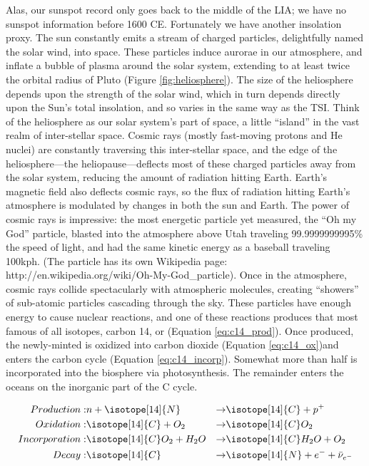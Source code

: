 Alas, our sunspot record only goes back to the middle of the LIA; we have no sunspot information before 1600 CE. Fortunately we have another insolation proxy. The sun constantly emits a stream of charged particles, delightfully named the solar wind, into space. These particles induce aurorae in our atmosphere, and inflate a bubble of plasma around the solar system, extending to at least twice the orbital radius of Pluto (Figure \ref{fig:heliosphere}). The size of the heliosphere depends upon the strength of the solar wind, which in turn depends directly upon the Sun's total insolation, and so varies in the same way as the TSI. Think of the heliosphere as our solar system's part of space, a little ``island'' in the vast realm of inter-stellar space. Cosmic rays (mostly fast-moving protons and He nuclei) are constantly traversing this inter-stellar space, and the edge of the heliosphere---the heliopause---deflects most of these charged particles away from the solar system, reducing the amount of radiation hitting Earth. Earth's magnetic field also deflects cosmic rays, so the flux of radiation hitting Earth's atmosphere is modulated by changes in both the sun and Earth.
The power of cosmic rays is impressive: the most energetic particle yet measured, the  ``Oh my God'' particle, blasted into the atmosphere above Utah traveling 99.9999999995\% the speed of light, and had the same kinetic energy as a baseball traveling 100kph. (The particle has its own Wikipedia page: http://en.wikipedia.org/wiki/Oh-My-God\_particle). Once in the atmosphere, cosmic rays collide spectacularly with atmospheric molecules, creating ``showers'' of sub-atomic particles cascading through the sky. These particles have enough energy to cause nuclear reactions, and one of these reactions produces that most famous of all isotopes, carbon 14, or   (Equation \ref{eq:c14_prod}). Once produced, the newly-minted  is oxidized into carbon dioxide (Equation \ref{eq:c14_ox})and enters the carbon cycle (Equation \ref{eq:c14_incorp}). Somewhat more than half is incorporated into the biosphere via photosynthesis. The remainder enters the oceans on the inorganic part of the C cycle.
 
\begin{align}
	Production: & n+\isotope[14]{N} & \rightarrow & \isotope[14]{C}+p^+ \label{eq:c14_prod} \\
	Oxidation:  & \isotope[14]{C}+O_2 & \rightarrow & \isotope[14]{C}O_2 \label{eq:c14_ox} \\
	Incorporation: & \isotope[14]{C}O_2+H_2O & \rightarrow & \isotope[14]{C}H_2O+O_2 \label {eq:c14_incorp} \\
	Decay: & \isotope[14]{C}&\rightarrow& \isotope[14]{N} + e^- +\bar{\nu}_{e^-}
\end{align}

